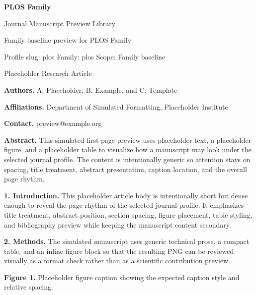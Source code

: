 \documentclass[10pt,a4paper]{article}
\begin{document}
\begin{flushleft}
{\LARGE\bfseries PLOS Family}\par
\vspace{0.25em}
{\small Journal Manuscript Preview Library}\par
\vspace{0.15em}
{\footnotesize Family baseline preview for PLOS Family}\par
\vspace{0.2em}
{\footnotesize Profile slug: plos \quad Family: plos \quad Scope: Family baseline}
\end{flushleft}
\vspace{0.2em}
 Placeholder Research Article\par\vspace{0.4em}


\noindent\textbf{Authors.} A. Placeholder, B. Example, and C. Template\par
\noindent\textbf{Affiliations.} Department of Simulated Formatting, Placeholder Institute\par
\noindent\textbf{Contact.} preview@example.org\par
\vspace{0.4em}
\noindent\textbf{Abstract.} This simulated first-page preview uses placeholder text, a placeholder figure, and a placeholder table to visualize how a manuscript may look under the selected journal profile. The content is intentionally generic so attention stays on spacing, title treatment, abstract presentation, caption location, and the overall page rhythm.\par\vspace{0.6em}



\small
\textbf{1. Introduction.} This placeholder article body is intentionally short but dense enough to reveal the page rhythm of the selected journal profile. It emphasizes title treatment, abstract position, section spacing, figure placement, table styling, and bibliography preview while keeping the manuscript content secondary.

\textbf{2. Methods.} The simulated manuscript uses generic technical prose, a compact table, and an inline figure block so that the resulting PNG can be reviewed visually as a format check rather than as a scientific contribution preview.


\begin{center}\end{center}\noindent\textbf{Figure 1.} Placeholder figure caption showing the expected caption style and relative spacing.\par\vspace{0.5em}
\end{document}
